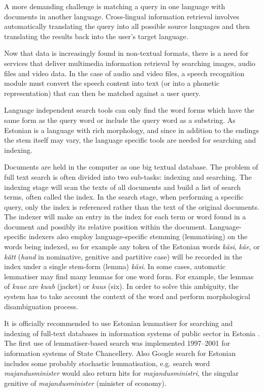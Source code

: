 \documentclass[]{../metanetpaper}
\begin{document}
\begin{multicols}{2}
A more demanding challenge is matching a query in one language with documents in another language. Cross-lingual information retrieval involves automatically translating the query into all possible source languages and then translating the results back into the user's target language.

Now that data is increasingly found in non-textual formats, there is a need for services that deliver multimedia information retrieval by searching images, audio files and video data. In the case of audio and video files, a speech recognition module must convert the speech content into text (or into a phonetic representation) that can then be matched against a user query.

Language independent search tools can only find the word forms which have the same form as the query word or include the query word as a substring. 
As Estonian is a language with rich morphology, and since in addition to the endings the stem itself may vary, the language specific tools are needed for searching and indexing. 

Documents are held in the computer as one big textual database. 
The problem of full text search is often divided into two sub-tasks: indexing and searching. 
The indexing stage will scan the texts of all documents and build a list of search terms, often called the index.
In the search stage, when performing a specific query, only the index is referenced rather than the text of the original documents.
The indexer will make an entry in the index for each term or word found in a document and possibly its relative position within the document. 
Language-specific indexers also employ language-specific stemming (lemmatising) on the words being indexed, so for example any token of the Estonian words \textit{käsi}, \textit{käe}, or \textit{kätt} (\textit{hand} in nominative, genitive and partitive case) will be recorded in the index under a single stem-form (lemma) \textit{käsi}.
In some cases, automatic lemmatiser may find many lemmas for one word form. 
For example, the lemmas of \textit{kuue} are \textit{kuub} (jacket) or \textit{kuus} (six). 
In order to solve this ambiguity, the system has to take account the context of the word and perform morphological disambiguation process.
 
It is officially recommended to use Estonian lemmatiser for searching and indexing of full-text databases in information systems of public sector in Estonia \cite{RIA}.
The first use of lemmatiser-based search was implemented 1997--2001 for information systems of State Chancellery.
Also Google search for Estonian includes some probably stochastic lemmatisation, e.g. search word \textit{majandusminister} would also return hits for \textit{majandusministri}, the singular genitive of \textit{majandusminister} (minister of economy).


\end{multicols}
\end{document}
